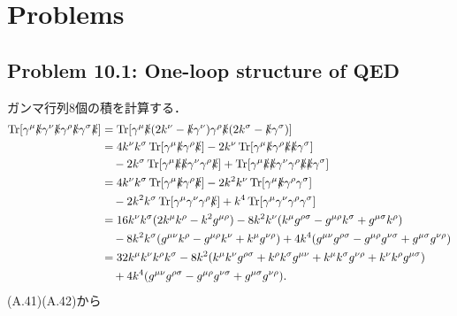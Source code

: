 \section*{Problems}
\subsection{Problem 10.1: One-loop structure of QED}
ガンマ行列8個の積を計算する．
\begin{align*}
  \operatorname{Tr} [ \gamma^\mu \slashed{k} \gamma^\nu \slashed{k} \gamma^\rho \slashed{k} \gamma^\sigma \slashed{k} ]
  &= \operatorname{Tr} [ \gamma^\mu \slashed{k} (2k^\nu - \slashed{k} \gamma^\nu) \gamma^\rho \slashed{k} (2k^\sigma - \slashed{k} \gamma^\sigma) ] \\
  &= 4k^\nu k^\sigma \operatorname{Tr} [ \gamma^\mu \slashed{k} \gamma^\rho \slashed{k} ]
  - 2k^\nu \operatorname{Tr} [ \gamma^\mu \slashed{k} \gamma^\rho \slashed{k} \slashed{k} \gamma^\sigma ] \\
  & \quad - 2k^\sigma \operatorname{Tr} [ \gamma^\mu \slashed{k} \slashed{k} \gamma^\nu \gamma^\rho \slashed{k} ]
  + \operatorname{Tr} [ \gamma^\mu \slashed{k} \slashed{k} \gamma^\nu \gamma^\rho \slashed{k} \slashed{k} \gamma^\sigma ] \\
  &= 4k^\nu k^\sigma \operatorname{Tr} [ \gamma^\mu \slashed{k} \gamma^\rho \slashed{k} ]
  - 2 k^2 k^\nu \operatorname{Tr} [ \gamma^\mu \slashed{k} \gamma^\rho \gamma^\sigma ] \\
  & \quad - 2 k^2 k^\sigma \operatorname{Tr} [ \gamma^\mu \gamma^\nu \gamma^\rho \slashed{k} ]
  + k^4 \operatorname{Tr} [ \gamma^\mu  \gamma^\nu \gamma^\rho \gamma^\sigma ] \\
  &= 16 k^\nu k^\sigma (2k^\mu k^\rho - k^2 g^{\mu\rho})
  - 8 k^2 k^\nu (k^\mu g^{\rho\sigma} - g^{\mu\rho}k^\sigma + g^{\mu\sigma}k^\rho) \\
  & \quad - 8 k^2 k^\sigma (g^{\mu\nu} k^\rho - g^{\mu\rho} k^\nu + k^\mu g^{\nu\rho})
  + 4k^4 (g^{\mu\nu}g^{\rho\sigma} - g^{\mu\rho}g^{\nu\sigma} + g^{\mu\sigma}g^{\nu\rho}) \\
  &= 32 k^\mu k^\nu k^\rho k^\sigma
  - 8k^2 ( k^\mu k^\nu g^{\rho\sigma} + k^\rho k^\sigma g^{\mu\nu} + k^\mu k^\sigma g^{\nu\rho} + k^\nu k^\rho g^{\mu\sigma} ) \\
  & \quad + 4k^4 (g^{\mu\nu}g^{\rho\sigma} - g^{\mu\rho}g^{\nu\sigma} + g^{\mu\sigma}g^{\nu\rho}) .
\end{align*}
(A.41)(A.42)から
